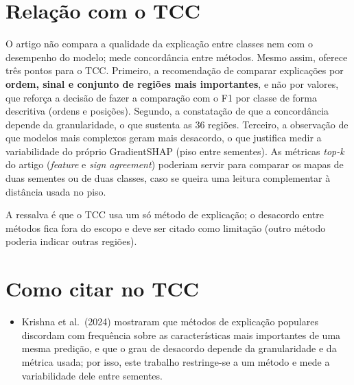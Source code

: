\documentclass[11pt,a4paper]{article}
\begin{document}
\section{Relação com o TCC}
O artigo não compara a qualidade da explicação entre classes nem com o desempenho do modelo; mede concordância entre métodos. Mesmo assim, oferece três pontos para o TCC. Primeiro, a recomendação de comparar explicações por \textbf{ordem, sinal e conjunto de regiões mais importantes}, e não por valores, que reforça a decisão de fazer a comparação com o F1 por classe de forma descritiva (ordens e posições). Segundo, a constatação de que a concordância depende da granularidade, o que sustenta as 36 regiões. Terceiro, a observação de que modelos mais complexos geram mais desacordo, o que justifica medir a variabilidade do próprio GradientSHAP (piso entre sementes). As métricas \textit{top-k} do artigo (\textit{feature} e \textit{sign agreement}) poderiam servir para comparar os mapas de duas sementes ou de duas classes, caso se queira uma leitura complementar à distância usada no piso.

A ressalva é que o TCC usa um só método de explicação; o desacordo entre métodos fica fora do escopo e deve ser citado como limitação (outro método poderia indicar outras regiões).

\section{Como citar no TCC}
\begin{itemize}
  \item Krishna et al.\ (2024) mostraram que métodos de explicação populares discordam com frequência sobre as características mais importantes de uma mesma predição, e que o grau de desacordo depende da granularidade e da métrica usada; por isso, este trabalho restringe-se a um método e mede a variabilidade dele entre sementes.
\end{itemize}
\end{document}

